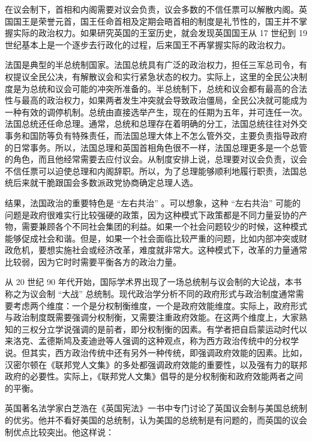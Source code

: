 在议会制下，首相和内阁需要对议会负责，议会多数的不信任票可以解散内阁。英国国王是荣誉元首，国王任命首相及定期会晤首相的制度是礼节性的，国王并不掌握实际的政治权力。如果研究英国的王室历史，就会发现英国国王从 17 世纪到 19 世纪基本上是一个逐步去行政化的过程，后来国王不再掌握实际的政治权力。

法国是典型的半总统制国家。法国总统具有广泛的政治权力，担任三军总司令，有权提议全民公决，有解散议会和实行紧急状态的权力。实际上，这里的全民公决制度是为总统和议会可能的冲突所准备的。半总统制下，总统和议会都有最高的合法性与最高的政治权力，如果两者发生冲突就会导致政治僵局，全民公决就可能成为一种有效的调停机制。总统由直接选举产生，现在的任期为五年，并可连任一次。法国总统还任命总理。通常，总统和总理存在着明确的分工，法国总统往往对外交事务和国防等负有特殊责任，而法国总理大体上不怎么管外交，主要负责指导政府的日常事务。所以，法国总理和英国首相角色很不一样，法国总理更多是一个总管的角色，而且他经常需要去应付议会。从制度安排上说，总理要对议会负责，议会不信任票可以迫使总理和内阁辞职。所以，为了总理能够顺利地履行职责，法国总统后来就干脆跟国会多数派政党协商确定总理人选。

结果，法国政治的重要特色是 “左右共治” 。可以想象，这种 “左右共治” 可能的问题是政府很难实行比较强硬的政策，因为这种模式下政策都是不同力量妥协的产物，需要兼顾各个不同社会集团的利益。如果一个社会问题较少的时候，这种模式能够促成社会和谐。但是，如果一个社会面临比较严重的问题，比如内部冲突或财政危机，要想实施社会或经济改革，难度就非常大。这种模式下，改革的力量通常比较弱，因为它时时需要平衡各方的政治力量。


从 20 世纪 90 年代开始，国际学术界出现了一场总统制与议会制的大论战，本书称之为议会制 “大战” 总统制。现代政治学分析不同的政府形式与政治制度通常需要考虑两个维度：一个是分权制衡维度，一个是政府效能维度。实际上，政府形式与政治制度既需要强调分权制衡，又需要注重政府效能。在这两个维度上，大家熟知的三权分立学说强调的是前者，即分权制衡的因素。有学者把自启蒙运动时代以来洛克、孟德斯鸠及麦迪逊等人强调的这种观点，称为西方政治传统中的分权学说。但其实，西方政治传统中还有另外一种传统，即强调政府效能的因素。比如，汉密尔顿在《联邦党人文集》的多处都强调政府效能的重要性，以及强有力的联邦政府的必要性。实际上，《联邦党人文集》倡导的是分权制衡和政府效能两者之间的平衡。

英国著名法学家白芝浩在《英国宪法》一书中专门讨论了英国议会制与美国总统制的优劣。他并不看好美国的总统制，认为美国的总统制是有问题的，而英国的议会制优点比较突出。他这样说：


